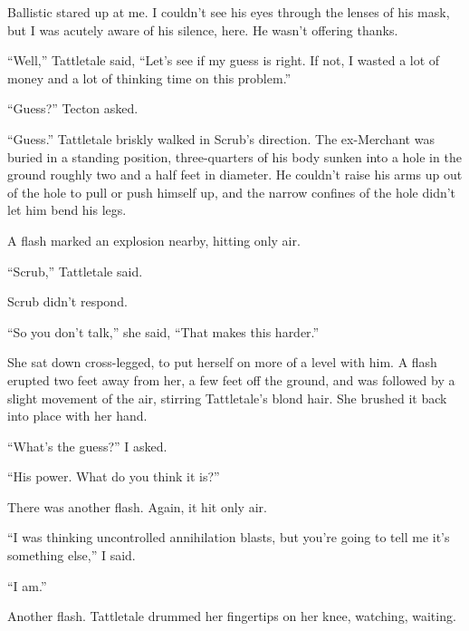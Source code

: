 Ballistic stared up at me.  I couldn't see his eyes through the lenses of his mask, but I was acutely aware of his silence, here.  He wasn't offering thanks.



``Well,'' Tattletale said, ``Let's see if my guess is right.  If not, I wasted a lot of money and a lot of thinking time on this problem.''



``Guess?'' Tecton asked.



``Guess.''  Tattletale briskly walked in Scrub's direction.  The ex-Merchant was buried in a standing position, three-quarters of his body sunken into a hole in the ground roughly two and a half feet in diameter.  He couldn't raise his arms up out of the hole to pull or push himself up, and the narrow confines of the hole didn't let him bend his legs.



A flash marked an explosion nearby, hitting only air.



``Scrub,'' Tattletale said.



Scrub didn't respond.



``So you don't talk,'' she said, ``That makes this harder.''



She sat down cross-legged, to put herself on more of a level with him.   A flash erupted two feet away from her, a few feet off the ground, and was followed by a slight movement of the air, stirring Tattletale's blond hair.  She brushed it back into place with her hand.



``What's the guess?'' I asked.



``His power.  What do you think it is?''



There was another flash.  Again, it hit only air.



``I was thinking uncontrolled annihilation blasts, but you're going to tell me it's something else,'' I said.



``I am.''



Another flash.  Tattletale drummed her fingertips on her knee, watching, waiting.



